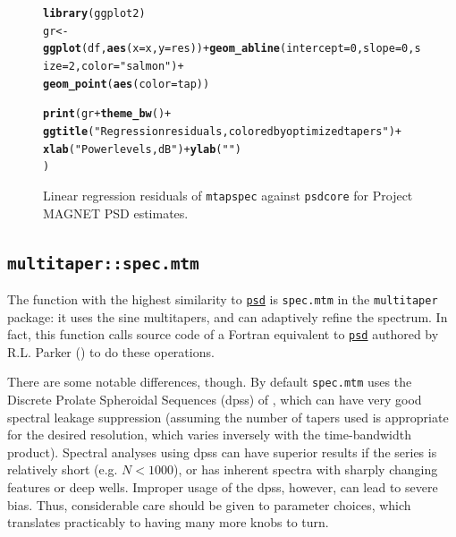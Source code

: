 \documentclass[10pt]{article}\usepackage[]{graphicx}\usepackage[]{color}
\makeatletter
\newcommand{\hlnum}[1]{\textcolor[rgb]{0.686,0.059,0.569}{#1}}%
\newcommand{\hlstr}[1]{\textcolor[rgb]{0.192,0.494,0.8}{#1}}%
\newcommand{\hlopt}[1]{\textcolor[rgb]{0,0,0}{#1}}%
\newcommand{\hlstd}[1]{\textcolor[rgb]{0.345,0.345,0.345}{#1}}%
\newcommand{\hlkwb}[1]{\textcolor[rgb]{0.69,0.353,0.396}{#1}}%
\newcommand{\hlkwc}[1]{\textcolor[rgb]{0.333,0.667,0.333}{#1}}%
\newcommand{\hlkwd}[1]{\textcolor[rgb]{0.737,0.353,0.396}{\textbf{#1}}}%
\newenvironment{kframe}{%
 \def\at@end@of@kframe{}%
 \ifinner\ifhmode%
  \def\at@end@of@kframe{\end{minipage}}%
  \begin{minipage}{\columnwidth}%
 \fi\fi%
 \def\FrameCommand##1{\hskip\@totalleftmargin \hskip-\fboxsep
 \colorbox{shadecolor}{##1}\hskip-\fboxsep
     \hskip-\linewidth \hskip-\@totalleftmargin \hskip\columnwidth}%
 \MakeFramed {\advance\hsize-\width
   \@totalleftmargin\z@ \linewidth\hsize
   \@setminipage}}%
 {\par\unskip\endMakeFramed%
 \at@end@of@kframe}
\newenvironment{knitrout}{}{} %
\newcommand{\Rcmd}[1]{\texttt{#1}}
\newcommand{\psd}[0]{\href{http://www.github.com/abarbour/psd/}{\color{blue}\Rcmd{psd}}}
\makeatother
\begin{document}
\begin{figure}[h!]
\begin{center}
\begin{knitrout}
\color{fgcolor}\begin{kframe}
\begin{alltt}
\hlkwd{library}\hlstd{(ggplot2)}
\hlstd{gr} \hlkwb{<-} \hlkwd{ggplot}\hlstd{(df,} \hlkwd{aes}\hlstd{(}\hlkwc{x}\hlstd{=x,} \hlkwc{y}\hlstd{=res))} \hlopt{+} \hlkwd{geom_abline}\hlstd{(}\hlkwc{intercept}\hlstd{=}\hlnum{0}\hlstd{,} \hlkwc{slope}\hlstd{=}\hlnum{0}\hlstd{,} \hlkwc{size}\hlstd{=}\hlnum{2}\hlstd{,} \hlkwc{color}\hlstd{=}\hlstr{"salmon"}\hlstd{)} \hlopt{+}
\hlkwd{geom_point}\hlstd{(}\hlkwd{aes}\hlstd{(}\hlkwc{color}\hlstd{=tap))}
\end{alltt}


{\ttfamily\noindent\bfseries\color{errorcolor}{\#\# Error: ggplot2 doesn't know how to deal with data of class function}}\begin{alltt}
\hlkwd{print}\hlstd{(gr} \hlopt{+} \hlkwd{theme_bw}\hlstd{()} \hlopt{+}
\hlkwd{ggtitle}\hlstd{(}\hlstr{"Regression residuals, colored by optimized tapers"}\hlstd{)}\hlopt{+}
\hlkwd{xlab}\hlstd{(}\hlstr{"Power levels, dB"}\hlstd{)} \hlopt{+} \hlkwd{ylab}\hlstd{(}\hlstr{""}\hlstd{)}
\hlstd{)}
\end{alltt}


{\ttfamily\noindent\bfseries{}}\end{kframe}
\end{knitrout}
\caption{Linear regression residuals of
\Rcmd{mtapspec} against \Rcmd{psdcore} for Project MAGNET PSD estimates.}
\label{fig:psdreg}
\end{center}
\end{figure}

\subsection{\Rcmd{multitaper::spec.mtm}}
The function with the highest similarity to \psd{} is
\Rcmd{spec.mtm} in the \Rcmd{multitaper} package: it uses
the sine multitapers, and can adaptively refine the spectrum.
In fact, this function
calls source code of a Fortran equivalent to \psd{}
authored by R.L. Parker (\citeyear{parkerweb}) to do these operations.

There are some notable differences, though.  
By default \Rcmd{spec.mtm}
 uses the Discrete Prolate Spheroidal Sequences (dpss) 
of \citet{thomson1982},
which can have very good spectral leakage suppression (assuming
the number of tapers used is appropriate for the 
desired resolution, which varies inversely with the time-bandwidth product).
Spectral analyses using dpss can have superior results if the series is
relatively short (e.g. $N < 1000$), or has inherent spectra
with sharply changing features or
deep wells.
Improper usage of the dpss, however, can lead to severe bias.
Thus, considerable care should be given to parameter choices, 
which translates practicably
to having many more knobs to turn.
\end{document}
